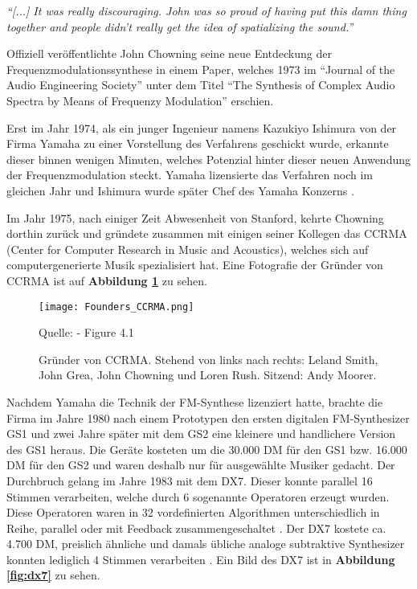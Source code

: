 \textit{``[...] It was really discouraging. John was so proud of having put this damn thing together and people didn't really get the idea of spatializing the sound.''}\cite[S. 43]{soundofinnovation}

Offiziell veröffentlichte John Chowning seine neue Entdeckung der Frequenzmodulationssynthese in einem Paper, welches 1973 im ``Journal of the Audio Engineering Society'' unter dem Titel ``The Synthesis of Complex Audio Spectra by Means of Frequenzy Modulation'' erschien.

Erst im Jahr 1974, als ein junger Ingenieur namens Kazukiyo Ishimura von der Firma Yamaha zu einer Vorstellung des Verfahrens geschickt wurde, erkannte dieser binnen wenigen Minuten, welches Potenzial hinter dieser neuen Anwendung der Frequenzmodulation steckt. Yamaha lizensierte das Verfahren noch im gleichen Jahr und Ishimura wurde später Chef des Yamaha Konzerns \cite{fatherofdigitalmusik}.

Im Jahr 1975, nach einiger Zeit Abwesenheit von Stanford, kehrte Chowning dorthin zurück und gründete zusammen mit einigen seiner Kollegen das CCRMA (Center for Computer Research in Music and Acoustics), welches sich auf computergenerierte Musik spezialisiert hat.
Eine Fotografie der Gründer von CCRMA ist auf \textbf{Abbildung \ref{fig:foundersCCRMA}} zu sehen.

\begin{figure} [ht]
\centering
  \texttt{[image: Founders\_CCRMA.png]}
\caption{Gründer von CCRMA. Stehend von links nach rechts: Leland Smith, John Grea, John Chowning und Loren Rush. Sitzend: Andy Moorer.}
\label{fig:foundersCCRMA}
Quelle: \cite[S. 52]{soundofinnovation} - Figure 4.1
\end{figure}

Nachdem Yamaha die Technik der FM-Synthese lizenziert hatte, brachte die Firma im Jahre 1980 nach einem Prototypen den ersten digitalen FM-Synthesizer GS1 und zwei Jahre später mit dem GS2 eine kleinere und handlichere Version des GS1 heraus. Die Geräte kosteten um die 30.000 DM für den GS1 bzw. 16.000 DM für den GS2 und waren deshalb nur für ausgewählte Musiker gedacht. Der Durchbruch gelang im Jahre 1983 mit dem DX7. Dieser konnte parallel 16 Stimmen verarbeiten, welche durch 6 sogenannte Operatoren erzeugt wurden. Diese Operatoren waren in 32 vordefinierten Algorithmen unterschiedlich in Reihe, parallel oder mit Feedback zusammengeschaltet \cite[S. 11]{dx7manual}. Der DX7 kostete ca. 4.700 DM, preislich ähnliche und damals übliche analoge subtraktive Synthesizer konnten lediglich 4 Stimmen verarbeiten \cite{fmGS1}. Ein Bild des DX7 ist in \textbf{Abbildung \ref{fig:dx7}} zu sehen.

